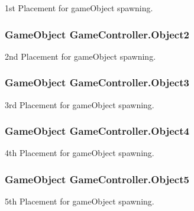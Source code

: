 1st Placement for game\-Object spawning. 

\hypertarget{classGameController_ab5c9311e9997c3d8a34833b3760f28f8}{
\subsubsection[{Object2}]{\setlength{\rightskip}{0pt plus 5cm}Game\-Object Game\-Controller.\-Object2}}\label{classGameController_ab5c9311e9997c3d8a34833b3760f28f8}


2nd Placement for game\-Object spawning. 

\hypertarget{classGameController_a9956f5a361f097e051a144a2b787e5ca}{
\subsubsection[{Object3}]{\setlength{\rightskip}{0pt plus 5cm}Game\-Object Game\-Controller.\-Object3}}\label{classGameController_a9956f5a361f097e051a144a2b787e5ca}


3rd Placement for game\-Object spawning. 

\hypertarget{classGameController_a983e7aca0a381e25974cb6b941907f07}{
\subsubsection[{Object4}]{\setlength{\rightskip}{0pt plus 5cm}Game\-Object Game\-Controller.\-Object4}}\label{classGameController_a983e7aca0a381e25974cb6b941907f07}


4th Placement for game\-Object spawning. 

\hypertarget{classGameController_a354cfdad1159788f59c1a1a7f0c812c2}{
\subsubsection[{Object5}]{\setlength{\rightskip}{0pt plus 5cm}Game\-Object Game\-Controller.\-Object5}}\label{classGameController_a354cfdad1159788f59c1a1a7f0c812c2}


5th Placement for game\-Object spawning. 

